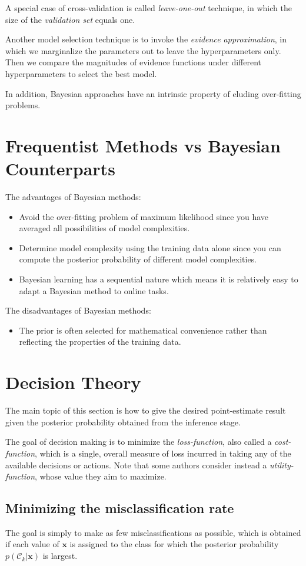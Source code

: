 \documentclass[a4paper]{book}
\renewcommand{\bf}{\mathbf}
\renewcommand{\cal}{\mathcal}
\newcommand{\imp}[1]{\textit{#1}}
\begin{document}
A special case of cross-validation is called \textit{leave-one-out} technique, in which the size of the \textit{validation set} equals one.

Another model selection technique is to invoke the \imp{evidence approximation}, in which we marginalize the parameters out to leave the hyperparameters only. Then we compare the magnitudes of evidence functions under different hyperparameters to select the best model.


In addition, Bayesian approaches have an intrinsic property of eluding over-fitting problems.\
\section{Frequentist Methods vs Bayesian Counterparts}
The advantages of Bayesian methods:
\begin{itemize}
	\item Avoid the over-fitting problem of maximum likelihood since you have averaged all possibilities of model complexities.
	\item Determine model complexity using the training data alone since you can compute the posterior probability of different model complexities.
	\item Bayesian learning has a sequential nature which means it is relatively easy to adapt a Bayesian method to online tasks.
\end{itemize}

The disadvantages of Bayesian methods:
\begin{itemize}
	\item The prior is often selected for mathematical convenience rather than reflecting the properties of the training data.
\end{itemize}
\section{Decision Theory}
The main topic of this section is how to give the desired point-estimate result given the posterior probability obtained from the inference stage. 

The goal of decision making is to minimize the \imp{loss-function}, also called a \imp{cost-function}, which is a single, overall measure of loss incurred in taking any of the available decisions or actions. Note that some authors consider instead a \imp{utility-function}, whose value they aim to maximize. 
\subsection{Minimizing the misclassification rate}
The goal is simply to make as few misclassifications as possible, which is obtained if each value of $\bf{x}$ is assigned to the class for which the posterior probability $p(\cal{C}_k|\bf{x})$ is largest.
\end{document}

